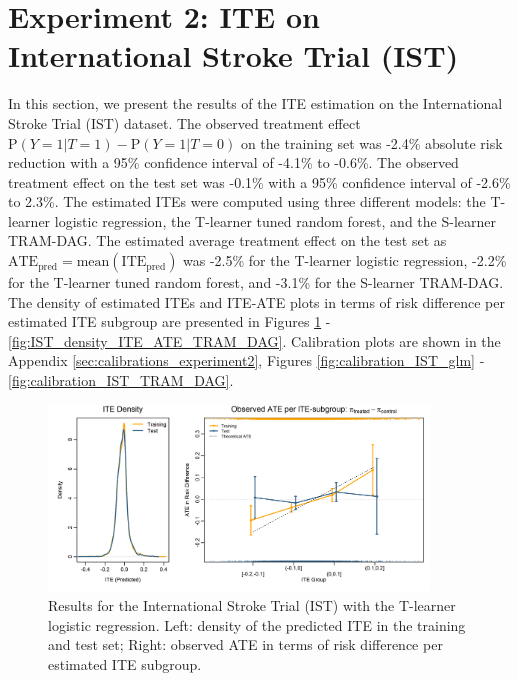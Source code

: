 \section{Experiment 2: ITE on International Stroke Trial (IST)} \label{sec:results_experiment2}


In this section, we present the results of the ITE estimation on the International Stroke Trial (IST) dataset. The observed treatment effect $\text{P}(Y=1|T=1) - \text{P}(Y=1|T=0)$ on the training set was -2.4\% absolute risk reduction with a 95\% confidence interval of -4.1\% to -0.6\%. The observed treatment effect on the test set was -0.1\% with a 95\% confidence interval of -2.6\% to 2.3\%. The estimated ITEs were computed using three different models: the T-learner logistic regression, the T-learner tuned random forest, and the S-learner TRAM-DAG. The estimated average treatment effect on the test set as $\text{ATE}_\text{pred}=\text{mean}(\text{ITE}_\text{pred})$ was -2.5\% for the T-learner logistic regression, -2.2\% for the T-learner tuned random forest, and -3.1\% for the S-learner TRAM-DAG. The density of estimated ITEs and ITE-ATE plots in terms of risk difference per estimated ITE subgroup are presented in Figures \ref{fig:IST_density_ITE_ATE_glm_tlearner} - \ref{fig:IST_density_ITE_ATE_TRAM_DAG}. Calibration plots are shown in the Appendix \ref{sec:calibrations_experiment2}, Figures \ref{fig:calibration_IST_glm} - \ref{fig:calibration_IST_TRAM_DAG}. 






\begin{figure}[htbp]
\centering
\includegraphics[width=0.9\textwidth]{img/results_IST/glm_tlearner_density_ITE_ATE.png}
\caption{Results for the International Stroke Trial (IST) with the T-learner logistic regression. Left: density of the predicted ITE in the training and test set; Right: observed ATE in terms of risk difference per estimated ITE subgroup.}
\label{fig:IST_density_ITE_ATE_glm_tlearner}
\end{figure}



